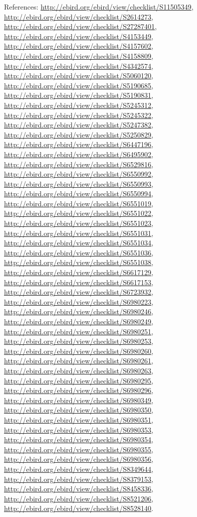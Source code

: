 \documentclass[9pt, article]{memoir}
\begin{document}
\begin{multicols}{2}
References: 
\url{http://ebird.org/ebird/view/checklist/S11505349}, 
\url{http://ebird.org/ebird/view/checklist/S2614273}, 
\url{http://ebird.org/ebird/view/checklist/S27287401}, 
\url{http://ebird.org/ebird/view/checklist/S4153449}, 
\url{http://ebird.org/ebird/view/checklist/S4157602}, 
\url{http://ebird.org/ebird/view/checklist/S4158809}, 
\url{http://ebird.org/ebird/view/checklist/S4342574}, 
\url{http://ebird.org/ebird/view/checklist/S5060120}, 
\url{http://ebird.org/ebird/view/checklist/S5190685}, 
\url{http://ebird.org/ebird/view/checklist/S5190831}, 
\url{http://ebird.org/ebird/view/checklist/S5245312}, 
\url{http://ebird.org/ebird/view/checklist/S5245322}, 
\url{http://ebird.org/ebird/view/checklist/S5247382}, 
\url{http://ebird.org/ebird/view/checklist/S5250829}, 
\url{http://ebird.org/ebird/view/checklist/S6447196}, 
\url{http://ebird.org/ebird/view/checklist/S6495902}, 
\url{http://ebird.org/ebird/view/checklist/S6529816}, 
\url{http://ebird.org/ebird/view/checklist/S6550992}, 
\url{http://ebird.org/ebird/view/checklist/S6550993}, 
\url{http://ebird.org/ebird/view/checklist/S6550994}, 
\url{http://ebird.org/ebird/view/checklist/S6551019}, 
\url{http://ebird.org/ebird/view/checklist/S6551022}, 
\url{http://ebird.org/ebird/view/checklist/S6551023}, 
\url{http://ebird.org/ebird/view/checklist/S6551031}, 
\url{http://ebird.org/ebird/view/checklist/S6551034}, 
\url{http://ebird.org/ebird/view/checklist/S6551036}, 
\url{http://ebird.org/ebird/view/checklist/S6551038}, 
\url{http://ebird.org/ebird/view/checklist/S6617129}, 
\url{http://ebird.org/ebird/view/checklist/S6617153}, 
\url{http://ebird.org/ebird/view/checklist/S6723932}, 
\url{http://ebird.org/ebird/view/checklist/S6980223}, 
\url{http://ebird.org/ebird/view/checklist/S6980246}, 
\url{http://ebird.org/ebird/view/checklist/S6980249}, 
\url{http://ebird.org/ebird/view/checklist/S6980251}, 
\url{http://ebird.org/ebird/view/checklist/S6980253}, 
\url{http://ebird.org/ebird/view/checklist/S6980260}, 
\url{http://ebird.org/ebird/view/checklist/S6980261}, 
\url{http://ebird.org/ebird/view/checklist/S6980263}, 
\url{http://ebird.org/ebird/view/checklist/S6980295}, 
\url{http://ebird.org/ebird/view/checklist/S6980296}, 
\url{http://ebird.org/ebird/view/checklist/S6980349}, 
\url{http://ebird.org/ebird/view/checklist/S6980350}, 
\url{http://ebird.org/ebird/view/checklist/S6980351}, 
\url{http://ebird.org/ebird/view/checklist/S6980353}, 
\url{http://ebird.org/ebird/view/checklist/S6980354}, 
\url{http://ebird.org/ebird/view/checklist/S6980355}, 
\url{http://ebird.org/ebird/view/checklist/S6980356}, 
\url{http://ebird.org/ebird/view/checklist/S8349644}, 
\url{http://ebird.org/ebird/view/checklist/S8379153}, 
\url{http://ebird.org/ebird/view/checklist/S8458336}, 
\url{http://ebird.org/ebird/view/checklist/S8521206}, 
\url{http://ebird.org/ebird/view/checklist/S8528140}.


\end{multicols}
\end{document}

